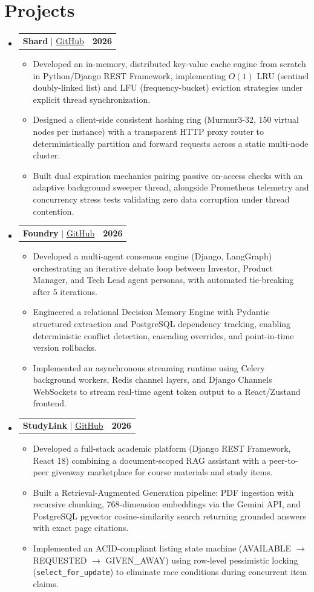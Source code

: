 \documentclass[letterpaper,10pt]{article}
\makeatletter
\newcommand{\resumeItem}[1]{
  \item\small{
    {#1 \vspace{-2pt}}
  }
}
\newcommand{\resumeProjectHeading}[2]{
    \item
    \begin{tabular*}{1.001\textwidth}{l@{\extracolsep{\fill}}r}
      \small#1 & \textbf{\small #2}\\
    \end{tabular*}\vspace{-7pt}
}
\newcommand{\resumeSubHeadingListStart}{\begin{itemize}[leftmargin=0.0in, label={}]}
\newcommand{\resumeSubHeadingListEnd}{\end{itemize}}
\newcommand{\resumeItemListStart}{\begin{itemize}}
\newcommand{\resumeItemListEnd}{\end{itemize}\vspace{-5pt}}
\makeatother
\begin{document}
\section{Projects}
    \vspace{-5pt}
    \resumeSubHeadingListStart
\resumeProjectHeading
    {\textbf{Shard} $|$ \href{https://github.com/vaibhv19/Shard}{\underline{GitHub}}}{2026}
    \resumeItemListStart
        \resumeItem{Developed an in-memory, distributed key-value cache engine from scratch in Python/Django REST Framework, implementing $O(1)$ LRU (sentinel doubly-linked list) and LFU (frequency-bucket) eviction strategies under explicit thread synchronization.}
        \resumeItem{Designed a client-side consistent hashing ring (Murmur3-32, 150 virtual nodes per instance) with a transparent HTTP proxy router to deterministically partition and forward requests across a static multi-node cluster.}
        \resumeItem{Built dual expiration mechanics pairing passive on-access checks with an adaptive background sweeper thread, alongside Prometheus telemetry and concurrency stress tests validating zero data corruption under thread contention.}
    \resumeItemListEnd
          \vspace{-13pt}
\resumeProjectHeading
    {\textbf{Foundry} $|$ \href{https://github.com/vaibhv19/Foundry}{\underline{GitHub}}}{2026}
    \resumeItemListStart
        \resumeItem{Developed a multi-agent consensus engine (Django, LangGraph) orchestrating an iterative debate loop between Investor, Product Manager, and Tech Lead agent personas, with automated tie-breaking after 5 iterations.}
        \resumeItem{Engineered a relational Decision Memory Engine with Pydantic structured extraction and PostgreSQL dependency tracking, enabling deterministic conflict detection, cascading overrides, and point-in-time version rollbacks.}
        \resumeItem{Implemented an asynchronous streaming runtime using Celery background workers, Redis channel layers, and Django Channels WebSockets to stream real-time agent token output to a React/Zustand frontend.}
    \resumeItemListEnd
          \vspace{-13pt}
\resumeProjectHeading
    {\textbf{StudyLink} $|$ \href{https://github.com/vaibhv19/StudyLink}{\underline{GitHub}}}{2026}
    \resumeItemListStart
        \resumeItem{Developed a full-stack academic platform (Django REST Framework, React 18) combining a document-scoped RAG assistant with a peer-to-peer giveaway marketplace for course materials and study items.}
        \resumeItem{Built a Retrieval-Augmented Generation pipeline: PDF ingestion with recursive chunking, 768-dimension embeddings via the Gemini API, and PostgreSQL pgvector cosine-similarity search returning grounded answers with exact page citations.}
        \resumeItem{Implemented an ACID-compliant listing state machine (AVAILABLE $\rightarrow$ REQUESTED $\rightarrow$ GIVEN\_AWAY) using row-level pessimistic locking (\texttt{select\_for\_update}) to eliminate race conditions during concurrent item claims.}
    \resumeItemListEnd
    \resumeSubHeadingListEnd
\vspace{-12pt}
\end{document}
